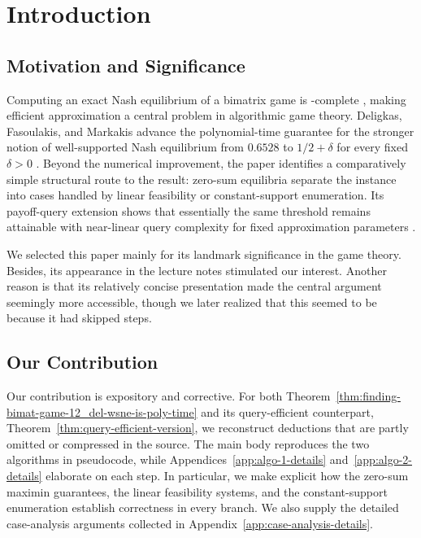 \section{Introduction}

\subsection{Motivation and Significance}

Computing an exact Nash equilibrium of a bimatrix game is \PPAD-complete \cite{DGP09}, making efficient approximation a central problem in algorithmic game theory. Deligkas, Fasoulakis, and Markakis advance the polynomial-time guarantee for the stronger notion of well-supported Nash equilibrium from \(0.6528\) to \(1/2+\delta\) for every fixed \(\delta>0\) \cite{12WSNE}. Beyond the numerical improvement, the paper identifies a comparatively simple structural route to the result: zero-sum equilibria separate the instance into cases handled by linear feasibility or constant-support enumeration. Its payoff-query extension shows that essentially the same threshold remains attainable with near-linear query complexity for fixed approximation parameters \cite[Section~4]{12WSNE}.

We selected this paper mainly for its landmark significance in the game theory. Besides, its appearance in the lecture notes stimulated our interest. Another reason is that its relatively concise presentation made the central argument seemingly more accessible, though we later realized that this seemed to be because it had skipped steps.

\subsection{Our Contribution}

Our contribution is expository and corrective. For both Theorem~\ref{thm:finding-bimat-game-12_del-wsne-is-poly-time} and its query-efficient counterpart, Theorem~\ref{thm:query-efficient-version}, we reconstruct deductions that are partly omitted or compressed in the source. The main body reproduces the two algorithms in pseudocode, while Appendices~\ref{app:algo-1-details} and~\ref{app:algo-2-details} elaborate on each step. In particular, we make explicit how the zero-sum maximin guarantees, the linear feasibility systems, and the constant-support enumeration establish correctness in every branch. We also supply the detailed case-analysis arguments collected in Appendix~\ref{app:case-analysis-details}.

